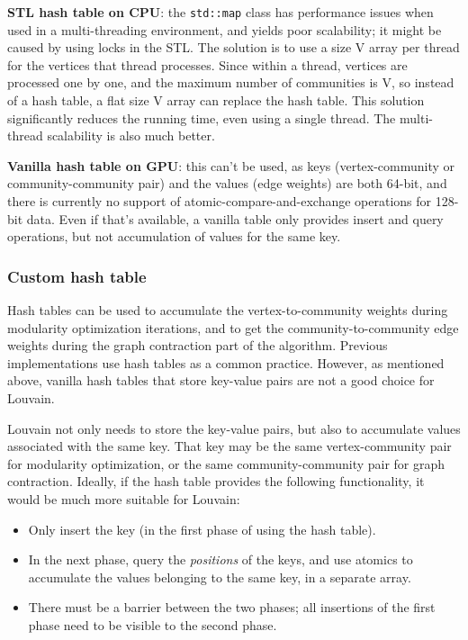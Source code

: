 \documentclass[10pt,oneside]{memoir}
\providecommand{\tightlist}{%
  \setlength{\itemsep}{0pt}\setlength{\parskip}{0pt}}
\begin{document}
\textbf{STL hash table on CPU}: the \texttt{std::map} class has
performance issues when used in a multi-threading environment, and
yields poor scalability; it might be caused by using locks in the STL.
The solution is to use a size \textbar{}V\textbar{} array per thread for
the vertices that thread processes. Since within a thread, vertices are
processed one by one, and the maximum number of communities is
\textbar{}V\textbar{}, so instead of a hash table, a flat size
\textbar{}V\textbar{} array can replace the hash table. This solution
significantly reduces the running time, even using a single thread. The
multi-thread scalability is also much better.

\textbf{Vanilla hash table on GPU}: this can't be used, as keys
(vertex-community or community-community pair) and the values (edge
weights) are both 64-bit, and there is currently no support of
atomic-compare-and-exchange operations for 128-bit data. Even if that's
available, a vanilla table only provides insert and query operations,
but not accumulation of values for the same key.

\hypertarget{custom-hash-table}{%
\subsubsection{Custom hash table}\label{custom-hash-table}}

Hash tables can be used to accumulate the vertex-to-community weights
during modularity optimization iterations, and to get the
community-to-community edge weights during the graph contraction part of
the algorithm. Previous implementations use hash tables as a common
practice. However, as mentioned above, vanilla hash tables that store
key-value pairs are not a good choice for Louvain.

Louvain not only needs to store the key-value pairs, but also to
accumulate values associated with the same key. That key may be the same
vertex-community pair for modularity optimization, or the same
community-community pair for graph contraction. Ideally, if the hash
table provides the following functionality, it would be much more
suitable for Louvain:

\begin{itemize}
\tightlist
\item
  Only insert the key (in the first phase of using the hash table).
\item
  In the next phase, query the \emph{positions} of the keys, and use
  atomics to accumulate the values belonging to the same key, in a
  separate array.
\item
  There must be a barrier between the two phases; all insertions of the
  first phase need to be visible to the second phase.
\end{itemize}
\end{document}
